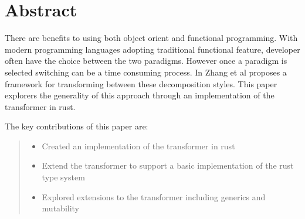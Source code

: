 \documentclass[ oneside,%
                    author={James Elgar},
                    degree={MEng},
                     title={Bidirectional transformer between functional and \\ object-oriented programming in Rust},
                  subtitle={}]{dissertation}
\newcommand{\weixin}{Zhang et al }
\begin{document}


\maketitle


\frontmatter





\chapter*{Abstract}

There are benefits to using both object orient and functional programming. With modern programming languages adopting traditional functional feature, developer often have the choice between the two paradigms. However once a paradigm is selected switching can be a time consuming process. In \cite{food} \weixin proposes a framework for transforming between these decomposition styles. This paper explorers the generality of this approach through an implementation of the transformer in rust. 

The key contributions of this paper are:

\begin{quote}
\noindent
\begin{itemize}
    \item Created an implementation of the \cite{food} transformer in rust
    \item Extend the \cite{food} transformer to support a basic implementation of the rust type system
    \item Explored extensions to the transformer including generics and mutability
\end{itemize}
\end{quote}
\end{document}
